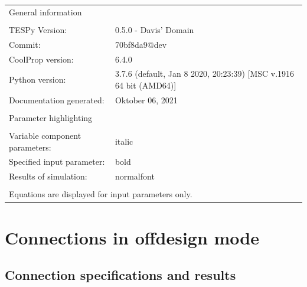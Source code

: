 \documentclass[]{article}
\newcommand{\iftab}{\fontshape{sl}\selectfont}
\newcommand{\bftab}{\fontseries{b}\selectfont}
\begin{document}
\begin{table}[H]
\begin{tabular}{ll}
\bftab General information&\\
& \\
TESPy Version:&0.5.0 - Davis' Domain\\
Commit:&70bf8da9@dev\\
CoolProp version:&6.4.0\\
Python version:&3.7.6 (default, Jan  8 2020, 20:23:39) [MSC v.1916 64 bit (AMD64)]\\
Documentation generated:&Oktober 06, 2021\\
& \\
\bftab Parameter highlighting&\\
& \\
Variable component parameters:& \iftab italic\\
Specified input parameter:& \bftab bold\\
Results of simulation:& normalfont \\
& \\
\multicolumn{2}{l}{\iftab Equations are displayed for input parameters only.}\\
\end{tabular}
\end{table}
\newpage\section{Connections in offdesign mode}

\subsection{Connection specifications and results}
\end{document}
